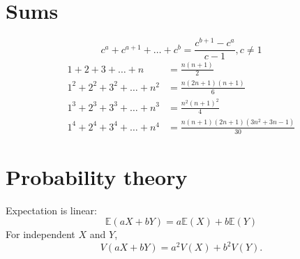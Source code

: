 \section{Sums}
\[ c^a + c^{a+1} + \dots + c^{b} = \frac{c^{b+1} - c^a}{c-1}, c \neq 1 \]
\begin{align*}
	1 + 2 + 3 + \dots + n &= \frac{n(n+1)}{2} \\
	1^2 + 2^2 + 3^2 + \dots + n^2 &= \frac{n(2n+1)(n+1)}{6} \\
	1^3 + 2^3 + 3^3 + \dots + n^3 &= \frac{n^2(n+1)^2}{4} \\
	1^4 + 2^4 + 3^4 + \dots + n^4 &= \frac{n(n+1)(2n+1)(3n^2 + 3n - 1)}{30}
\end{align*}

\section{Probability theory}
Expectation is linear:
\[\mathbb{E}(aX+bY) = a\mathbb{E}(X)+b\mathbb{E}(Y)\]
For independent $X$ and $Y$, 
\[V(aX+bY) = a^2V(X)+b^2V(Y).\]